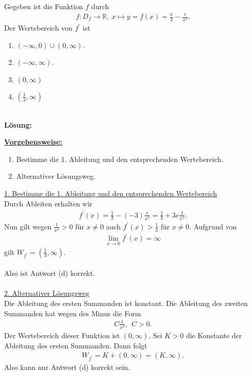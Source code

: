 \newpage


\subsection*{}
Gegeben ist die Funktion $ f $ durch
\begin{align*}
f : D_f \to \mathbb{R}, \ x \mapsto y = f(x) = \frac{x}{3} - \frac{e}{x^3}.
\end{align*}
Der Wertebereich von $ f^\prime$ ist
\renewcommand{\labelenumi}{(\alph{enumi})}
\begin{enumerate}
	\item 
	$ (- \infty,0) \cup (0,\infty) $.
	\item
	$ (-\infty,\infty) $.
	\item
	$ (0, \infty) $
	\item
	$ ( \frac{1}{3}, \infty) $
\end{enumerate}
\ \\
\textbf{Lösung:}
\begin{mdframed}
\underline{\textbf{Vorgehensweise:}}
\renewcommand{\labelenumi}{\theenumi.}
\begin{enumerate}
\item Bestimme die 1. Ableitung und den entsprechenden Wertebereich.
\item Alternativer Lösungsweg.
 
\end{enumerate}
\end{mdframed}


\underline{1. Bestimme die 1. Ableitung und den entsprechenden Wertebereich}\\
Durch Ableiten erhalten wir
\begin{align*}
f^\prime (x)
=
\frac{1}{3} - (-3) \frac{e}{x^4}
= \frac{1	}{3} + 3 e \frac{1}{x^4}.
\end{align*}
Nun gilt wegen $ \frac{1}{x^4} > 0 $ für $ x \neq 0  $ auch 
$ f^\prime(x) > \frac{1}{3} $ für $ x \neq 0 $.
Aufgrund von 
\begin{align*}
\lim \limits_{ x \to 0 } f^\prime(x)  = \infty
\end{align*}
gilt $ W_{f^\prime} = \left( \frac{1}{3} , \infty \right) $.\\
\\
Also ist Antwort (d) korrekt.\\
\\
\underline{2. Alternativer Lösungsweg}\\
Die Ableitung des ersten Summanden ist konstant.
Die Ableitung des zweiten Summanden hat wegen des Minus die Form
\begin{align*}
C \frac{1}{x^4}, \ \ C > 0.
\end{align*}
Der Wertebereich dieser Funktion ist $ (0,\infty) $. Sei $ K > 0  $ die Konstante der Ableitung des ersten Summanden.
Dann folgt 
\begin{align*}
W_{f^\prime} = K + (0,\infty) = ( K ,\infty).
\end{align*}
Also kann nur Antwort (d) korrekt sein.


